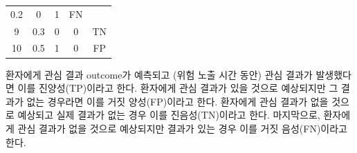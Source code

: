\documentclass[10.5pt]{book}
\theoremstyle{definition}
\theoremstyle{definition}
\theoremstyle{definition}
\theoremstyle{remark}
\begin{document}
\begin{longtable}[]{@{}ccccc@{}}
\begin{minipage}[t]{0.14\columnwidth}
0.2\strut
\end{minipage} & \begin{minipage}[t]{0.14\columnwidth}\centering\strut
0\strut
\end{minipage} & \begin{minipage}[t]{0.14\columnwidth}\centering\strut
1\strut
\end{minipage} & \begin{minipage}[t]{0.11\columnwidth}\centering\strut
FN\strut
\end{minipage}\tabularnewline
\begin{minipage}[t]{0.12\columnwidth}\centering\strut
9\strut
\end{minipage} & \begin{minipage}[t]{0.14\columnwidth}\centering\strut
0.3\strut
\end{minipage} & \begin{minipage}[t]{0.14\columnwidth}\centering\strut
0\strut
\end{minipage} & \begin{minipage}[t]{0.14\columnwidth}\centering\strut
0\strut
\end{minipage} & \begin{minipage}[t]{0.11\columnwidth}\centering\strut
TN\strut
\end{minipage}\tabularnewline
\begin{minipage}[t]{0.12\columnwidth}\centering\strut
10\strut
\end{minipage} & \begin{minipage}[t]{0.14\columnwidth}\centering\strut
0.5\strut
\end{minipage} & \begin{minipage}[t]{0.14\columnwidth}\centering\strut
1\strut
\end{minipage} & \begin{minipage}[t]{0.14\columnwidth}\centering\strut
0\strut
\end{minipage} & \begin{minipage}[t]{0.11\columnwidth}\centering\strut
FP\strut
\end{minipage}\tabularnewline
\bottomrule
\end{longtable}

환자에게 관심 결과 outcome가 예측되고 (위험 노출 시간 동안) 관심 결과가
발생했다면 이를 진양성(TP)이라고 한다. 환자에게 관심 결과가 있을 것으로
예상되지만 그 결과가 없는 경우라면 이를 거짓 양성(FP)이라고 한다.
환자에게 관심 결과가 없을 것으로 예상되고 실제 결과가 없는 경우 이를
진음성(TN)이라고 한다. 마지막으로, 환자에게 관심 결과가 없을 것으로
예상되지만 결과가 있는 경우 이를 거짓 음성(FN)이라고
한다.  
\end{document}
